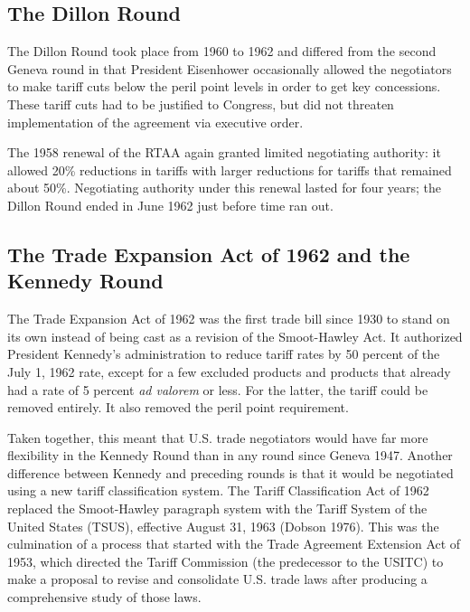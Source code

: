 \documentclass[
  12pt,
]{article}
\begin{document}
\hypertarget{the-dillon-round}{%
\subsection{The Dillon Round}\label{the-dillon-round}}

The Dillon Round took place from 1960 to 1962 and differed from the second Geneva round in that President Eisenhower occasionally allowed the negotiators to make tariff cuts below the peril point levels in order to get key concessions. These tariff cuts had to be justified to Congress, but did not threaten implementation of the agreement via executive order.

The 1958 renewal of the RTAA again granted limited negotiating authority: it allowed 20\% reductions in tariffs with larger reductions for tariffs that remained about 50\%. Negotiating authority under this renewal lasted for four years; the Dillon Round ended in June 1962 just before time ran out.

\hypertarget{the-trade-expansion-act-of-1962-and-the-kennedy-round}{%
\subsection{The Trade Expansion Act of 1962 and the Kennedy Round}\label{the-trade-expansion-act-of-1962-and-the-kennedy-round}}

The Trade Expansion Act of 1962 was the first trade bill since 1930 to stand on its own instead of being cast as a revision of the Smoot-Hawley Act. It authorized President Kennedy's administration to reduce tariff rates by 50 percent of the July 1, 1962 rate, except for a few excluded products and products that already had a rate of 5 percent \emph{ad valorem} or less. For the latter, the tariff could be removed entirely. It also removed the peril point requirement.

Taken together, this meant that U.S. trade negotiators would have far more flexibility in the Kennedy Round than in any round since Geneva 1947. Another difference between Kennedy and preceding rounds is that it would be negotiated using a new tariff classification system. The Tariff Classification Act of 1962 replaced the Smoot-Hawley paragraph system with the Tariff System of the United States (TSUS), effective August 31, 1963 (Dobson 1976). This was the culmination of a process that started with the Trade Agreement Extension Act of 1953, which directed the Tariff Commission (the predecessor to the USITC) to make a proposal to revise and consolidate U.S. trade laws after producing a comprehensive study of those laws.
\end{document}
